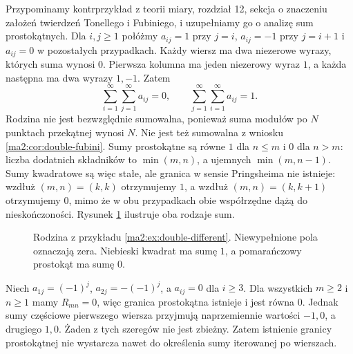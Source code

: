 \begin{przyklad}
\label{ma2:ex:double-different}
\label{ex:nonabs-fubini-12}
Przypominamy kontrprzykład z teorii miary, rozdział 12,
sekcja o znaczeniu założeń twierdzeń Tonellego i Fubiniego,
i uzupełniamy go o analizę sum prostokątnych.
Dla $i,j\ge1$ połóżmy $a_{ij}=1$ przy $j=i$,
$a_{ij}=-1$ przy $j=i+1$ i $a_{ij}=0$ w pozostałych
przypadkach. Każdy wiersz ma dwa niezerowe wyrazy,
których suma wynosi $0$. Pierwsza kolumna ma jeden
niezerowy wyraz $1$, a każda następna ma dwa
wyrazy $1,-1$. Zatem
\[
 \sum_{i=1}^{\infty}\sum_{j=1}^{\infty}a_{ij}=0,
 \qquad
 \sum_{j=1}^{\infty}\sum_{i=1}^{\infty}a_{ij}=1.
\]
Rodzina nie jest bezwzględnie sumowalna, ponieważ
suma modułów po $N$ punktach przekątnej wynosi $N$.
Nie jest też sumowalna z wniosku
\ref{ma2:cor:double-fubini}.
Sumy prostokątne są równe $1$ dla $n\le m$ i $0$
dla $n>m$: liczba dodatnich składników to
$\min(m,n)$, a ujemnych $\min(m,n-1)$.
Sumy kwadratowe są więc stałe, ale granica w sensie
Pringsheima nie istnieje: wzdłuż $(m,n)=(k,k)$
otrzymujemy $1$, a wzdłuż $(m,n)=(k,k+1)$ otrzymujemy
$0$, mimo że w obu przypadkach obie współrzędne
dążą do nieskończoności. Rysunek
\ref{ma2:fig:double-different} ilustruje oba rodzaje sum.
\end{przyklad}

\begin{figure}[htbp]
\centering
{}
\caption{Rodzina z przykładu \ref{ma2:ex:double-different}.
Niewypełnione pola oznaczają zera. Niebieski kwadrat
ma sumę $1$, a pomarańczowy prostokąt ma sumę $0$.}
\label{ma2:fig:double-different}
\end{figure}
\FloatBarrier

\begin{przyklad}
\label{ma2:ex:rectangular-not-iterated}
Niech $a_{1j}=(-1)^j$, $a_{2j}=-(-1)^j$,
a $a_{ij}=0$ dla $i\ge3$. Dla wszystkich $m\ge2$
i $n\ge1$ mamy $R_{mn}=0$, więc granica prostokątna
istnieje i jest równa $0$. Jednak sumy częściowe
pierwszego wiersza przyjmują naprzemiennie wartości
$-1,0$, a drugiego $1,0$. Żaden z tych szeregów
nie jest zbieżny. Zatem istnienie granicy prostokątnej
nie wystarcza nawet do określenia sumy iterowanej
po wierszach.
\end{przyklad}

